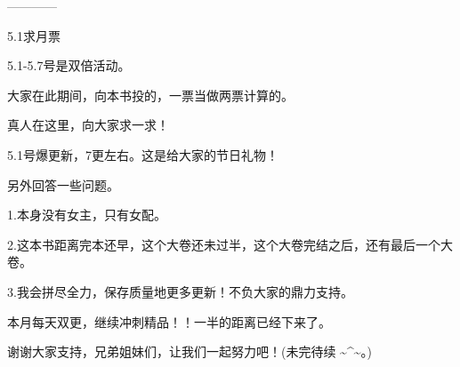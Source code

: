 \begin{this_body}
------------

5.1求月票

5.1-5.7号是双倍活动。

大家在此期间，向本书投的，一票当做两票计算的。

真人在这里，向大家求一求！

5.1号爆更新，7更左右。这是给大家的节日礼物！

另外回答一些问题。

1.本身没有女主，只有女配。

2.这本书距离完本还早，这个大卷还未过半，这个大卷完结之后，还有最后一个大卷。

3.我会拼尽全力，保存质量地更多更新！不负大家的鼎力支持。

本月每天双更，继续冲刺精品！！一半的距离已经下来了。

谢谢大家支持，兄弟姐妹们，让我们一起努力吧！(未完待续 \~{}\^{}\~{}。)

\end{this_body}

